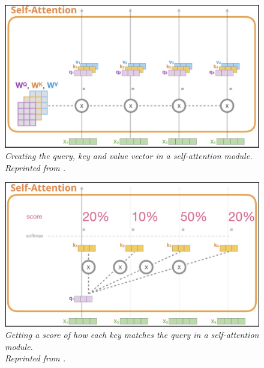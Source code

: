 \begin{figure}[H]
  \centering
  \caption[Creating the query, key and value vector in a self-attention module.]{\emph{Creating the query, key and value vector in a self-attention module. \\ 
  Reprinted from \citeauthor{alammar_2018} \citeyear{alammar_2018}.}}\label{fig:attention_2}
  \includegraphics[scale = 0.3]{figures/attention_2.jpg}  
\end{figure}

\begin{figure}[H]
  \centering
  \caption[Getting a score of how each key matches the query in a self-attention module.]{\emph{Getting a score of how each key matches the query in a self-attention module. \\ 
  Reprinted from \citeauthor{alammar_2018} \citeyear{alammar_2018}.}}\label{fig:attention_3}
  \includegraphics[scale = 0.3]{figures/attention_3.jpg}  
\end{figure}

